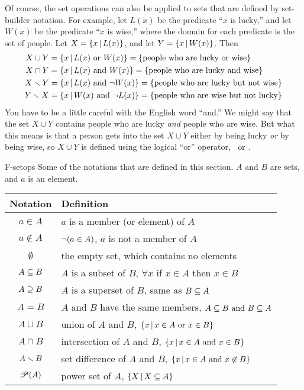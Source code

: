 Of course, the set operations can also be applied to sets that are defined by set-builder notation.
For example, let $L(x)$ be the predicate ``$x$ is lucky,'' and let $W(x)$ be the predicate ``$x$ is wise,'' where the domain for each predicate is the set of people.
Let $X = \{x\,|\, L(x)\}$, and let $Y=\{x\,|\, W(x)\}$.
Then
\begin{align*}
  X\cup Y &= \{x\,|\, L(x)\text{ or } W(x)\} = \{\text{people who are lucky or wise}\}\\
  X\cap Y &= \{x\,|\, L(x)\text{ and } W(x)\} = \{\text{people who are lucky and wise}\}\\
  X\smallsetminus Y &= \{x\,|\, L(x)\text{ and } \lnot W(x)\} = \{\text{people who are lucky but not wise}\}\\
  Y\smallsetminus X &= \{x\,|\, W(x)\text{ and } \lnot L(x)\} = \{\text{people who are wise but not lucky}\}
\end{align*}
You have to be a little careful with the English word ``and.''
We might say that the set $X\cup Y$ contains people who are lucky \emph{and} people who are wise.
But what this means is that a person gets into the set $X\cup Y$ either by being lucky \emph{or} by being wise, so $X\cup Y$ is defined using the logical ``or'' operator,~$\text{ or }$.

\medbreak

\fig
  {F-setops}
  {Some of the notations that are defined in this section.  $A$ and $B$ are
   sets, and $a$ is an element.}
  {\begin{tabular}{|c|l|}
        \hline
        \strut\textbf{Notation} & \textbf{Definition}\\
        \hline
        \strut $a\in A$      & $a$ is a member (or element) of $A$\\ 
        \strut $a\not\in A$  & $\lnot(a\in A)$, $a$ is not a member of $A$\\
        \strut $\emptyset$   & the empty set, which contains no elements\\
        \strut $A\subseteq B$     & $A$ is a subset of $B$, $\forall x$ if $x\in A$ then $x\in B$\\
        \strut $A\supseteq B$     & $A$ is a superset of $B$, same as $B\subseteq A$\\
        \strut $A=B$         & $A$ and $B$ have the same members, $A\subseteq B\text{ and } B\subseteq A$\\
        \strut $A\cup B$     & union of $A$ and $B$, $\{x\,|\, x\in A\text{ or } x\in B\}$\\
        \strut $A\cap B$     & intersection of $A$ and $B$, $\{x\,|\, x\in A\text{ and } x\in B\}$\\
        \strut $A\smallsetminus B$ & set difference of $A$ and $B$, $\{x\,|\, x\in A\text{ and } x\not\in B\}$\\
        \strut ${\mathscr P}(A)$     & power set of $A$, $\{X\,|\, X\subseteq A\}$\\
        \hline
     \end{tabular}
   }

